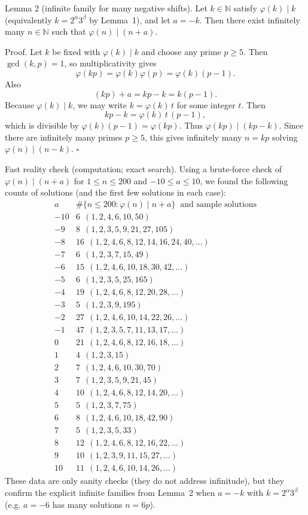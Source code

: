 Lemma 2 (infinite family for many negative shifts).
Let $k\in\mathbb{N}$ satisfy $\varphi(k)\mid k$ (equivalently $k=2^\alpha 3^\beta$ by Lemma~1), and let $a=-k$.
Then there exist infinitely many $n\in\mathbb{N}$ such that $\varphi(n)\mid (n+a)$.

Proof.
Let $k$ be fixed with $\varphi(k)\mid k$ and choose any prime $p\ge5$.
Then $\gcd(k,p)=1$, so multiplicativity gives
\[
\varphi(kp)=\varphi(k)\varphi(p)=\varphi(k)(p-1).
\]
Also
\[
(kp)+a = kp-k = k(p-1).
\]
Because $\varphi(k)\mid k$, we may write $k=\varphi(k)\,t$ for some integer $t$.
Then
\[
kp-k = \varphi(k)\,t\,(p-1),
\]
which is divisible by $\varphi(k)(p-1)=\varphi(kp)$.
Thus $\varphi(kp)\mid (kp-k)$.
Since there are infinitely many primes $p\ge5$, this gives infinitely many $n=kp$ solving $\varphi(n)\mid (n-k)$.
$\square$

Fast reality check (computation; exact search).
Using a brute-force check of $\varphi(n)\mid (n+a)$ for $1\le n\le 200$ and $-10\le a\le 10$, we found the following counts of solutions (and the first few solutions in each case):
\[
\begin{array}{r|l}
 a & \#\{n\le 200: \varphi(n)\mid n+a\}\ \text{ and sample solutions}\\\hline
 -10 & 6\ \ (1,2,4,6,10,50)\\
 -9 & 8\ \ (1,2,3,5,9,21,27,105)\\
 -8 & 16\ \ (1,2,4,6,8,12,14,16,24,40,\dots)\\
 -7 & 6\ \ (1,2,3,7,15,49)\\
 -6 & 15\ \ (1,2,4,6,10,18,30,42,\dots)\\
 -5 & 6\ \ (1,2,3,5,25,165)\\
 -4 & 19\ \ (1,2,4,6,8,12,20,28,\dots)\\
 -3 & 5\ \ (1,2,3,9,195)\\
 -2 & 27\ \ (1,2,4,6,10,14,22,26,\dots)\\
 -1 & 47\ \ (1,2,3,5,7,11,13,17,\dots)\\
 0 & 21\ \ (1,2,4,6,8,12,16,18,\dots)\\
 1 & 4\ \ (1,2,3,15)\\
 2 & 7\ \ (1,2,4,6,10,30,70)\\
 3 & 7\ \ (1,2,3,5,9,21,45)\\
 4 & 10\ \ (1,2,4,6,8,12,14,20,\dots)\\
 5 & 5\ \ (1,2,3,7,75)\\
 6 & 8\ \ (1,2,4,6,10,18,42,90)\\
 7 & 5\ \ (1,2,3,5,33)\\
 8 & 12\ \ (1,2,4,6,8,12,16,22,\dots)\\
 9 & 10\ \ (1,2,3,9,11,15,27,\dots)\\
 10 & 11\ \ (1,2,4,6,10,14,26,\dots)
\end{array}
\]
These data are only sanity checks (they do not address infinitude), but they confirm the explicit infinite families from Lemma~2 when $a=-k$ with $k=2^\alpha 3^\beta$ (e.g. $a=-6$ has many solutions $n=6p$).

